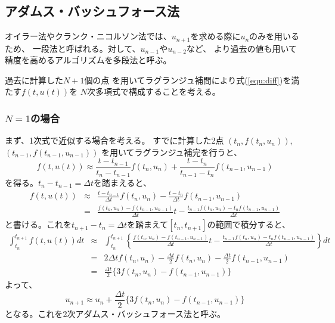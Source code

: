 \documentclass[a4j, titlepage]{jsarticle}
\numberwithin{equation}{section}
\begin{document}
    \subsection{アダムス・バッシュフォース法}
        オイラー法やクランク・ニコルソン法では、$u_{n+1}$を求める際に$u_{n}$のみを用いるため、
        一段法と呼ばれる。対して、$u_{n-1}$や$u_{n-2}$など、
        より過去の値も用いて精度を高めるアルゴリズムを多段法と呼ぶ。

        過去に計算した$N+1$個の点
        を用いてラグランジュ補間により式(\ref{equ:diff})を満たす$f(t, u(t))$を
        $N$次多項式で構成することを考える。

        \subsubsection{$N=1$の場合}
            まず、1次式で近似する場合を考える。
            すでに計算した2点
            $(t_n, f(t_n, u_n))$,
            $(t_{n-1}, f(t_{n-1}, u_{n-1}))$
            を用いてラグランジュ補完を行うと、
            \begin{equation*}
                f(t, u(t)) \approx \frac{t - t_{n-1}}{t_n - t_{n-1}}f(t_n, u_n) + \frac{t - t_n}{t_{n-1} - t_n}f(t_{n-1}, u_{n-1})
            \end{equation*}
            を得る。$t_n - t_{n-1} = \Delta t$を踏まえると、
            \begin{eqnarray*}
                f(t, u(t)) &\approx& \frac{t - t_{n-1}}{\Delta t}f(t_n, u_n) - \frac{t - t_n}{\Delta t}f(t_{n-1}, u_{n-1}) \\
                &=& \frac{f(t_n, u_n) - f(t_{n-1}, u_{n-1})}{\Delta t}t - \frac{t_{n-1}f(t_n, u_n) - t_nf(t_{n-1}, u_{n-1})}{\Delta t}
            \end{eqnarray*}
            と書ける。これを$t_{n+1} - t_{n} = \Delta t$を踏まえて$[t_n, t_{n+1}]$の範囲で積分すると、
            \begin{eqnarray*}
                \int^{t_{n+1}}_{t_n} f(t, u(t)) dt &\approx& \int^{t_{n+1}}_{t_n} \left\{ \frac{f(t_n, u_n) - f(t_{n-1}, u_{n-1})}{\Delta t}t - \frac{t_{n-1}f(t_n, u_n) - t_nf(t_{n-1}, u_{n-1})}{\Delta t} \right\} dt \\
                &=& 2\Delta t f(t_n, u_n) - \frac{\Delta t}{2} f(t_n, u_n) - \frac{\Delta t}{2} f(t_{n-1}, u_{n-1}) \\
                &=& \frac{\Delta t}{2} \{3f(t_n, u_n) - f(t_{n-1}, u_{n-1})\}
            \end{eqnarray*}
            よって、
            \begin{equation}
                u_{n+1} \approx u_n + \frac{\Delta t}{2} \{3f(t_n, u_n) - f(t_{n-1}, u_{n-1})\}
            \end{equation}
            となる。これを2次アダムス・バッシュフォース法と呼ぶ。
\end{document}
